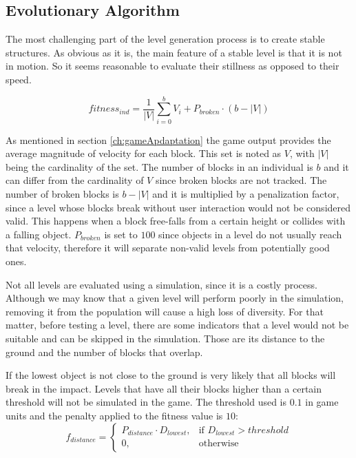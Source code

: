 \subsection{Evolutionary Algorithm}\label{ch:Representation}

The most challenging part of the level generation process is to create stable structures. As obvious as it is, the main feature of a stable level is that it is not in motion. So it seems reasonable to evaluate their stillness as opposed to their speed.

$$fitness_{ind} = \frac{1}{|V|}\sum_{i=0}^{b}{V_i} + P_{broken}\cdot(b-|V|)$$

As mentioned in section \ref{ch:gameApdaptation} the game output provides the average magnitude of velocity for each block. This set is noted as $V$, with $|V|$ being the cardinality of the set. The number of blocks in an individual is $b$ and it can differ from the cardinality of $V$ since broken blocks are not tracked. The number of broken blocks is $b-|V|$ and it is multiplied by a penalization factor, since a level whose blocks break without user interaction would not be considered valid. This happens when a block free-falls from a certain height or collides with a falling object. $P_{broken}$ is set to $100$ since objects in a level do not usually reach that velocity, therefore it will separate non-valid levels from potentially good ones.

  

Not all levels are evaluated using a simulation, since it is a costly process. Although we may know that a given level will perform poorly in the simulation, removing it from the population will cause a high loss of diversity. For that matter, before testing a level, there are some indicators that a level would not be suitable and can be skipped in the simulation. Those are its distance to the ground and the number of blocks that overlap.

If the lowest object is not close to the ground is very likely that all blocks will break in the impact. Levels that have all their blocks higher than a certain threshold will not be simulated in the game. The threshold used is $0.1$ in game units and the penalty applied to the fitness value is $10$:
$$f_{distance} = 
\begin{cases}
	P_{distance}\cdot D_{lowest}, & \text{if } D_{lowest} > threshold\\
	0, & \text{otherwise}
\end{cases}
 $$

